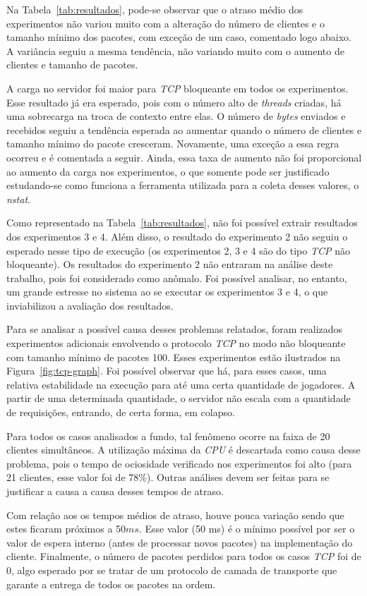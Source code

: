 \documentclass[12pt]{article}
\begin{document}
Na Tabela~\ref{tab:resultados}, pode-se observar que o atraso médio dos
experimentos não variou muito com a alteração do número de clientes e o tamanho
mínimo dos pacotes, com exceção de um caso, comentado logo abaixo. A variância
seguiu a mesma tendência, não variando muito com o aumento de clientes e
tamanho de pacotes.

A carga no servidor foi maior para \emph{TCP} bloqueante em todos os
experimentos. Esse resultado já era esperado, pois com o número alto de
\emph{threads} criadas, há uma sobrecarga na troca de contexto entre elas. O
número de \emph{bytes} enviados e recebidos seguiu a tendência esperada ao
aumentar quando o número de clientes e tamanho mínimo do pacote cresceram.
Novamente, uma exceção a essa regra ocorreu e é comentada a seguir. Ainda, essa
taxa de aumento não foi proporcional ao aumento da carga nos experimentos, o
que somente pode ser justificado estudando-se como funciona a ferramenta
utilizada para a coleta desses valores, o \emph{nstat}.

Como representado na Tabela~\ref{tab:resultados}, não foi possível extrair
resultados dos experimentos 3 e 4. Além disso, o resultado do experimento 2 não
seguiu o esperado nesse tipo de execução (os experimentos 2, 3 e 4 são do tipo
\emph{TCP} não bloqueante). Os resultados do experimento 2 não entraram na
análise deste trabalho, pois foi considerado como anômalo. Foi possível
analisar, no entanto, um grande estresse no sistema ao se executar os
experimentos 3 e 4, o que inviabilizou a avaliação dos resultados.

Para se analisar a possível causa desses problemas relatados, foram realizados
experimentos adicionais envolvendo o protocolo \emph{TCP} no modo não
bloqueante com tamanho mínimo de pacotes 100. Esses experimentos estão
ilustrados na Figura~\ref{fig:tcp-graph}. Foi possível observar que há, para
esses casos, uma relativa estabilidade na execução para até uma certa
quantidade de jogadores. A partir de uma determinada quantidade, o servidor não
escala com a quantidade de requisições, entrando, de certa forma, em colapso.

Para todos os casos analisados a fundo, tal fenômeno ocorre na faixa de 20
clientes simultâneos. A utilização máxima da \emph{CPU} é descartada como
causa desse problema, pois o tempo de ociosidade verificado nos experimentos
foi alto (para 21 clientes, esse valor foi de 78\%). Outras análises devem ser
feitas para se justificar a causa a causa desses tempos de atraso.

Com relação aos os tempos médios de atraso, houve pouca variação sendo que
estes ficaram próximos a 50$ms$. Esse valor (50 ms) é o mínimo possível por ser
o valor de espera interno (antes de processar novos pacotes) na implementação
do cliente. Finalmente, o número de pacotes perdidos para todos
os casos \emph{TCP} foi de 0, algo esperado por se tratar de um protocolo de
camada de transporte que garante a entrega de todos os pacotes na ordem.
\end{document}
